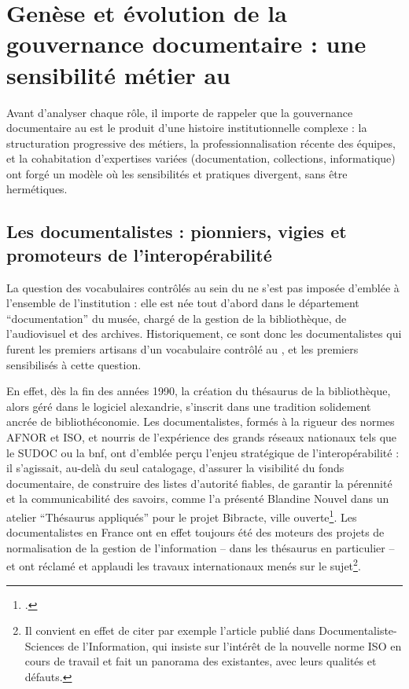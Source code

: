 \section{\label{II-B-1}Genèse et évolution de la gouvernance documentaire : une sensibilité métier au \mae}

Avant d’analyser chaque rôle, il importe de rappeler que la gouvernance documentaire au \mae est le produit d’une histoire institutionnelle complexe : la structuration progressive des métiers, la professionnalisation récente des équipes, et la cohabitation d’expertises variées (documentation, collections, informatique) ont forgé un modèle où les sensibilités et pratiques divergent, sans être hermétiques.

\subsection{Les documentalistes : pionniers, vigies et promoteurs de l’interopérabilité}

La question des vocabulaires contrôlés au sein du \mae ne s’est pas imposée d’emblée à l’ensemble de l’institution : elle est née tout d'abord dans le département \enquote{documentation} du musée, chargé de la gestion de la bibliothèque, de l'audiovisuel et des archives. Historiquement, ce sont donc les documentalistes qui furent les premiers artisans d'un vocabulaire contrôlé au \mae, et les premiers sensibilisés à cette question.

En effet, dès la fin des années 1990, la création du thésaurus de la bibliothèque, alors géré dans le logiciel \gls{alexandrie}, s’inscrit dans une tradition solidement ancrée de bibliothéconomie. Les documentalistes, formés à la rigueur des normes AFNOR et ISO, et nourris de l’expérience des grands réseaux nationaux tels que le SUDOC ou la \ac{bnf}, ont d’emblée perçu l’enjeu stratégique de l’interopérabilité : il s’agissait, au-delà du seul catalogage, d’assurer la visibilité du fonds documentaire, de construire des listes d’autorité fiables, de garantir la pérennité et la communicabilité des savoirs, comme l'a présenté Blandine Nouvel dans un atelier \enquote{Thésaurus appliqués} pour le projet Bibracte, ville ouverte\footcite{nouvelOutilsDindexationBibliothecaires2022}. Les documentalistes en France ont en effet toujours été des moteurs des projets de normalisation de la gestion de l'information -- dans les thésaurus en particulier -- et ont réclamé et applaudi les travaux internationaux menés sur le sujet\footnote{Il convient en effet de citer par exemple l'article  publié dans Documentaliste-Sciences de l'Information, qui insiste sur l'intérêt de la nouvelle norme ISO en cours de travail et fait un panorama des existantes, avec leurs qualités et défauts.}.

